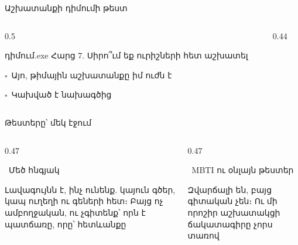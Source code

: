 \begin{frame}{Աշխատանքի դիմումի թեստ}
  \begin{columns}[c]
    \begin{column}{0.5\textwidth}
      \begin{popup}{դիմում.exe}
        {\blackfont Հարց 7. Սիրո՞ւմ եք ուրիշների հետ աշխատել}\par\medskip
        $\square$\ Այո, թիմային աշխատանքը իմ ուժն է\par\smallskip
        $\square$\ Կախված է նախագծից\par\smallskip
      \end{popup}
    \end{column}
    \begin{column}{0.44\textwidth}
    \end{column}
  \end{columns}
\end{frame}

\begin{frame}{Թեստերը՝ մեկ էջում}
  \begin{columns}[T]
    \begin{column}{0.47\textwidth}
      \begin{card}[colback=mint!35!cardwhite]
        \ {\blackfont Մեծ հնգյակ}\par\smallskip
        Լավագույնն է, ինչ ունենք. կայուն գծեր, կապ ուղեղի ու գեների հետ։ Բայց ոչ ամբողջական, ու չգիտենք՝ որն է պատճառը, որը՝ հետևանքը
      \end{card}
    \end{column}
    \begin{column}{0.47\textwidth}
      \begin{card}[colback=brainpink!25!cardwhite]
        \ {\blackfont MBTI ու օնլայն թեստեր}\par\smallskip
        Զվարճալի են, բայց գիտական չեն։ Ու մի որոշիր աշխատակցի ճակատագիրը չորս տառով
      \end{card}
    \end{column}
  \end{columns}
  \vspace{3mm}
\end{frame}

